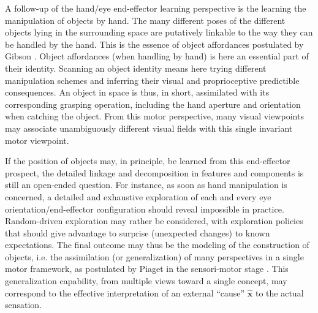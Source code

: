 \documentclass[11pt]{article}
\begin{document}
A follow-up of the hand/eye end-effector learning perspective is the learning the manipulation of objects by hand. The many different poses of the different objects lying in the surrounding space are putatively linkable to the way they can be handled by the hand. This is the essence of object affordances postulated by Gibson \cite{Gib79}. Object affordances (when handling by hand) is here an essential part of their identity. Scanning an object identity means here trying different manipulation schemes and inferring their visual and proprioceptive predictible consequences. An object in space is thus, in short, assimilated with its corresponding grasping operation, including the hand aperture and orientation when catching the object. From this motor perspective, many visual viewpoints may associate unambiguously different visual fields with this single invariant motor viewpoint. 

If the position of objects may, in principle, be learned from this end-effector prospect, the detailed linkage and decomposition in features and components is still an open-ended question. For instance, as soon as hand manipulation is concerned, a detailed and exhaustive exploration of each and every eye orientation/end-effector configuration should reveal impossible in practice. Random-driven exploration may rather be considered, with
exploration policies that should give advantage to surprise (unexpected changes) to known expectations. 
The final outcome may thus be the modeling of the construction of objects, i.e. the assimilation (or generalization) of many perspectives in a single motor framework, as postulated by Piaget in the sensori-motor stage \cite{Piaget1973}. This generalization capability, from multiple views toward a single concept, may correspond to the effective interpretation of an external ``cause'' $\hat{\boldsymbol{x}}$ to the actual sensation.  




\end{document}
